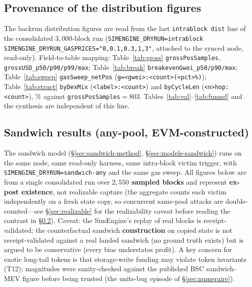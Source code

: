 \documentclass[11pt]{article}
\newcommand{\code}[1]{\texttt{#1}}
\begin{document}
\subsection{Provenance of the distribution figures}
\label{sec:fill}
The backrun distribution figures are read from the last \code{intrablock dist} line of
the consolidated $3{,}000$-block run (\code{SIMENGINE\_DRYRUN=intrablock
SIMENGINE\_DRYRUN\_GASPRICES="0,0.1,0.3,1,3"}, attached to the synced node,
read-only). Field-to-table mapping: Table~\ref{tab:gross} \code{grossPosSamples},
\code{grossUSD\_p50/p90/p99/max}; Table~\ref{tab:break}
\code{breakevenGwei\_p50/p90/max}; Table~\ref{tab:sweep} \code{gasSweep\_netPos}
(\code{g=<gwei>:<count>(<pct>\%)}); Table~\ref{tab:struct} \code{byDexMix}
(\code{<label>:<count>}) and \code{byCycleLen} (\code{<n>hop:<count>}), \% against
\code{grossPosSamples}$=803$. Tables~\ref{tab:val}--\ref{tab:funnel} and the
synthesis are independent of this line.

\subsection{Sandwich results (any-pool, EVM-constructed)}
\label{sec:sandwich-results}
The sandwich model (\S\ref{sec:sandwich-method}, \S\ref{sec:models-sandwich}) runs on
the same node, same read-only harness, same intra-block victim trigger, with
\code{SIMENGINE\_DRYRUN=sandwich-any} and the same gas sweep. All figures below are
from a single consolidated run over \textbf{$2{,}550$ sampled blocks} and represent
\textbf{ex-post existence}, not realizable capture (the aggregate counts each victim
independently on a fresh state copy, so concurrent same-pool attacks are
double-counted---see \S\ref{sec:realizable} for the realizability caveat before reading
the contrast in \S\ref{sec:sandwich-results}). Caveat: the SimEngine's replay of real
blocks is receipt-validated; the counterfactual sandwich \textbf{construction} on copied
state is not receipt-validated against a real landed sandwich (no ground truth exists)
but is argued to be conservative (every bias understates profit). A key concern for exotic
long-tail tokens is that storage-write funding may violate token invariants (T12);
magnitudes were sanity-checked against the published BSC sandwich-MEV figure before
being trusted (the units-bug episode of \S\ref{sec:numeraire}).
\end{document}
